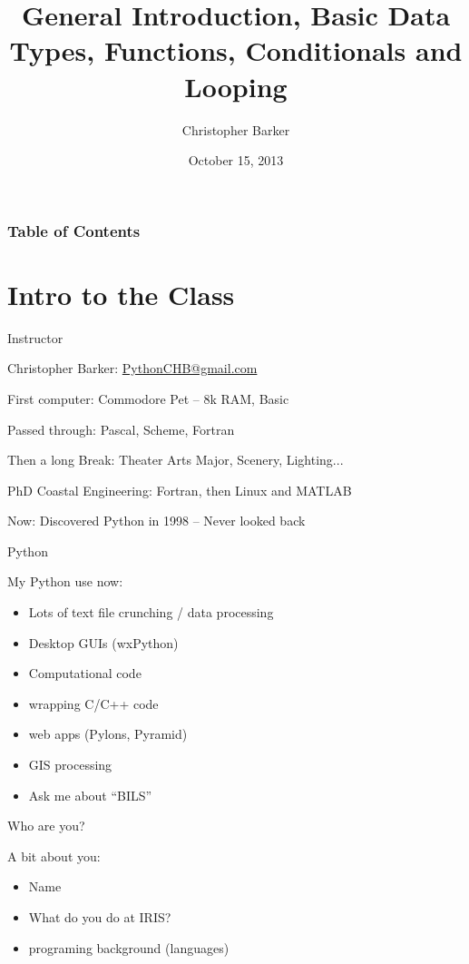 \documentclass{beamer}
\title[IRIS Python Workshop Seesion 1]{General Introduction, Basic Data Types, Functions, Conditionals and Looping}
\author{Christopher Barker}
\institute{IRIS}
\date{October 15, 2013}
\begin{document}
\begin{frame}
\titlepage
\end{frame}

\begin{frame}
\frametitle{Table of Contents}
\tableofcontents
\end{frame}

\section{Intro to the Class}

\begin{frame}[fragile]{Instructor}

{\large Christopher Barker: \url{PythonCHB@gmail.com} }

\vfill
First computer: Commodore Pet -- 8k RAM, Basic

\vfill
Passed through: Pascal, Scheme, Fortran

\vfill
Then a long Break: Theater Arts Major, Scenery, Lighting...

\vfill
PhD Coastal Engineering: Fortran, then Linux and MATLAB

\vfill
Now: Discovered Python in 1998 -- Never looked back

\end{frame}

\begin{frame}{Python}

{\Large     My Python use now:}
\begin{itemize}
   \item Lots of text file crunching / data processing
   \item Desktop GUIs (wxPython)
   \item Computational code
   \item wrapping C/C++ code      
   \item web apps (Pylons, Pyramid)
   \item GIS processing
   \item Ask me about ``BILS'' 
\end{itemize}
\end{frame}


\begin{frame}{Who are you?}

{\Large A bit about you:}
\begin{itemize}
  \item Name
  \item What do you do at IRIS?
  \item programing background (languages)
\end{itemize}

\end{frame}
\end{document}
